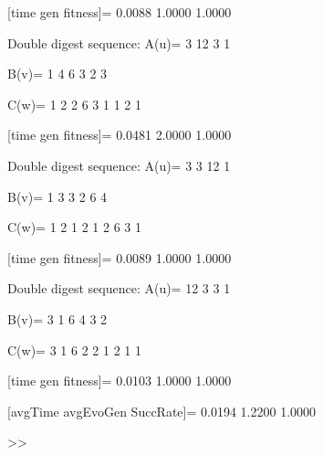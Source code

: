 [time gen fitness]=
    0.0088    1.0000    1.0000

Double digest sequence:
A(u)=
     3    12     3     1

B(v)=
     1     4     6     3     2     3

C(w)=
     1     2     2     6     3     1     1     2     1

[time gen fitness]=
    0.0481    2.0000    1.0000

Double digest sequence:
A(u)=
     3     3    12     1

B(v)=
     1     3     3     2     6     4

C(w)=
     1     2     1     2     1     2     6     3     1

[time gen fitness]=
    0.0089    1.0000    1.0000

Double digest sequence:
A(u)=
    12     3     3     1

B(v)=
     3     1     6     4     3     2

C(w)=
     3     1     6     2     2     1     2     1     1

[time gen fitness]=
    0.0103    1.0000    1.0000

[avgTime  avgEvoGen  SuccRate]=
    0.0194    1.2200    1.0000

>> 